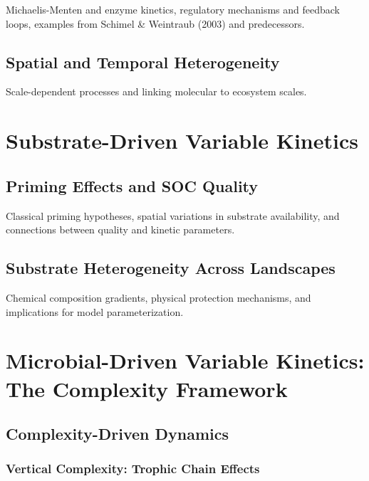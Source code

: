 \documentclass[12pt,a4paper]{article}
\begin{document}
Michaelis-Menten and enzyme kinetics, regulatory mechanisms and feedback loops, examples from Schimel \& Weintraub (2003) and predecessors.

\subsection{Spatial and Temporal Heterogeneity} \label{sec:theory_heterogeneity}

Scale-dependent processes and linking molecular to ecosystem scales.


\section{Substrate-Driven Variable Kinetics} \label{sec:substrate}

\subsection{Priming Effects and SOC Quality} \label{sec:substrate_priming}

Classical priming hypotheses, spatial variations in substrate availability, and connections between quality and kinetic parameters.

\subsection{Substrate Heterogeneity Across Landscapes} \label{sec:substrate_landscape}

Chemical composition gradients, physical protection mechanisms, and implications for model parameterization.



\section{Microbial-Driven Variable Kinetics: The Complexity Framework} \label{sec:microbial}


\subsection{Complexity-Driven Dynamics} \label{sec:microbial_complexity}


\subsubsection{Vertical Complexity: Trophic Chain Effects} \label{sec:microbial_vertical}
\end{document}
